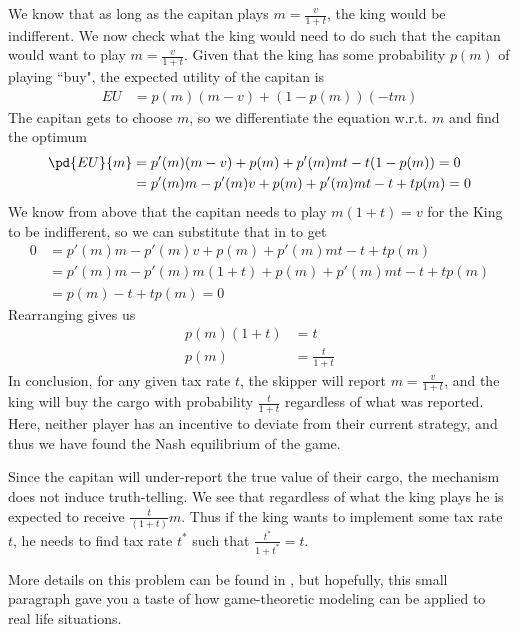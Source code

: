 We know that as long as the capitan plays $m = \frac{v}{1 + t}$, the king would be indifferent. We now check what the king would need to do such that the capitan would want to play $m = \frac{v}{1+t}$. Given that the king has some probability $p(m)$ of playing ``buy", the expected utility of the capitan is
\begin{align*}
    EU &= p(m)(m - v) + (1 - p(m))(-tm)
\end{align*}
The capitan gets to choose $m$, so we differentiate the equation w.r.t. $m$ and find the optimum
\begin{align*}
    \pd{EU}{m} & = p'(m)(m-v) + p(m) + p'(m)mt -t(1-p(m)) = 0 \\
    & = p'(m)m - p'(m)v + p(m) + p'(m)mt -t + tp(m) = 0
\end{align*}
We know from above that the capitan needs to play $m(1+t) = v$ for the King to be indifferent, so we can substitute that in to get
\begin{align*}
    0 & = p'(m)m - p'(m)v + p(m) + p'(m)mt -t + tp(m) \\
    & =  p'(m)m - p'(m)m(1+t)  + p(m) + p'(m)mt -t + tp(m) \\
    & = p(m) -t + tp(m) = 0
\end{align*}
Rearranging gives us
\begin{align*}
    p(m)(1 + t) & = t\\
    p(m) & = \frac{t}{1+t}
\end{align*}
In conclusion, for any given tax rate $t$, the skipper will report $m = \frac{v}{1+t}$, and the king will buy the cargo with probability $\frac{t}{1+t}$ regardless of what was reported. Here, neither player has an incentive to deviate from their current strategy, and thus we have found the Nash equilibrium of the game. 

Since the capitan will under-report the true value of their cargo, the mechanism does not induce truth-telling. We see that regardless of what the king plays he is expected to receive $\frac{t}{(1+t)}m$. Thus if the king wants to implement some tax rate $t$, he needs to find tax rate $t^*$ such that $\frac{t^*}{1+t^*} = t$.

More details on this problem can be found in \citet{Haan_2012_Taxation}, but hopefully, this small paragraph gave you a taste of how game-theoretic modeling can be applied to real life situations. 
